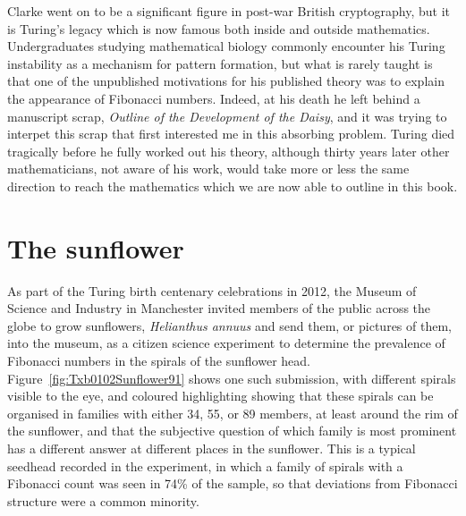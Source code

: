 Clarke went on to be a significant figure in post-war British cryptography, but it is Turing's legacy which is now famous both inside and outside mathematics.
Undergraduates studying mathematical biology commonly encounter his Turing instability as a mechanism for pattern formation, but what is  rarely  taught is that one of the unpublished motivations for his published theory was to explain the appearance of Fibonacci numbers. Indeed, at his death he left behind a manuscript scrap, \textit{Outline of the Development of the Daisy}, and it was trying to interpet this scrap that first interested me in this absorbing problem. Turing died tragically before he fully worked out his theory, although thirty years later other mathematicians, not aware of his work, would take more or less the same direction to reach the mathematics which we are now able to outline in this book. 


\section{The sunflower}

As part of the Turing birth centenary celebrations in 2012, the Museum of Science and Industry in Manchester invited members of the public across the globe to grow sunflowers, \textit{Helianthus annuus} and send them, or pictures of them, into the museum, as a citizen science experiment to determine the prevalence of Fibonacci numbers in the spirals of the sunflower head. Figure~\ref{fig:Txb0102Sunflower91} shows one such submission, with different spirals visible to the eye, 
and coloured highlighting showing that these spirals can be organised in families with either 34, 55, or 89 members, at least around the rim of the sunflower, and that the subjective question of which family is most prominent has a different answer at different places in the sunflower.  This is a typical seedhead recorded in the experiment, in which a family of spirals with a Fibonacci count was seen in 74\% of the sample, so that deviations from Fibonacci structure were a common minority.

